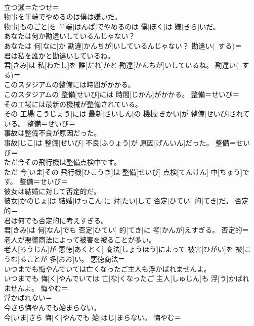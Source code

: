 \documentclass[8pt]{extreport}
\begin{document}
\begin{CJK}{UTF8}{min}
\\	立つ瀬＝たつせ＝ 
\\	物事を半端でやめるのは僕は嫌いだ。	
\\	物事[ものごと]を 半端[はんぱ]でやめるのは 僕[ぼく]は 嫌[きら]いだ。	
\\	あなたは何か勘違いしているんじゃない？	
\\	あなたは 何[なに]か 勘違[かんちが]いしているんじゃない？	勘違い(~する)＝ 
\\	君は私を誰かと勘違いしているね。	
\\	君[きみ]は 私[わたし]を 誰[だれ]かと 勘違[かんちが]いしているね。	勘違い(~する)＝ 
\\	このスタジアムの整備には時間がかかる。	
\\	このスタジアムの 整備[せいび]には 時間[じかん]がかかる。	整備＝せいび＝ 
\\	その工場には最新の機械が整備されている。	
\\	その 工場[こうじょう]には 最新[さいしん]の 機械[きかい]が 整備[せいび]されている。	整備＝せいび＝ 
\\	事故は整備不良が原因だった。	
\\	事故[じこ]は 整備[せいび] 不良[ふりょう]が 原因[げんいん]だった。	整備＝せいび＝ 
\\	ただ今その飛行機は整備点検中です。	
\\	ただ 今[いま]その 飛行機[ひこうき]は 整備[せいび] 点検[てんけん] 中[ちゅう]です。	整備＝せいび＝ 
\\	彼女は結婚に対して否定的だ。	
\\	彼女[かのじょ]は 結婚[けっこん]に 対[たい]して 否定[ひてい] 的[てき]だ。	否定的＝ 
\\	君は何でも否定的に考えすぎる。	
\\	君[きみ]は 何[なん]でも 否定[ひてい] 的[てき]に 考[かんが]えすぎる。	否定的＝ 
\\	老人が悪徳商法によって被害を被ることが多い。	
\\	老人[ろうじん]が 悪徳[あくとく] 商法[しょうほう]によって 被害[ひがい]を 被[こうむ]ることが 多[おお]い。	悪徳商法＝ 
\\	いつまでも悔やんでいては亡くなったご主人も浮かばれませんよ。	
\\	いつまでも 悔[く]やんでいては 亡[な]くなったご 主人[しゅじん]も 浮[う]かばれませんよ。	悔やむ＝ 
\\	浮かばれない＝ 
\\	今さら悔やんでも始まらない。	
\\	今[いま]さら 悔[く]やんでも 始[はじ]まらない。	悔やむ＝ 

\end{CJK}
\end{document}
